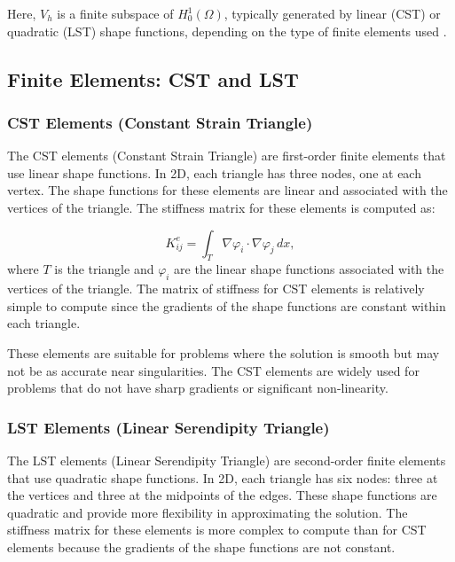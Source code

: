 Here, \(V_h\) is a finite subspace of \(H_0^1(\Omega)\), typically generated by linear (CST) or quadratic (LST) shape functions, depending on the type of finite elements used \cite{galerkin_method}.

\subsection{Finite Elements: CST and LST}

\subsubsection{CST Elements (Constant Strain Triangle)}

The CST elements (Constant Strain Triangle) are first-order finite elements that use linear shape functions. In 2D, each triangle has three nodes, one at each vertex. The shape functions for these elements are linear and associated with the vertices of the triangle. The stiffness matrix for these elements is computed as:

\begin{equation}
    K^e_{ij} = \int_T \nabla \varphi_i \cdot \nabla \varphi_j \, dx,
\end{equation}
where \(T\) is the triangle and \(\varphi_i\) are the linear shape functions associated with the vertices of the triangle. The matrix of stiffness for CST elements is relatively simple to compute since the gradients of the shape functions are constant within each triangle.

These elements are suitable for problems where the solution is smooth but may not be as accurate near singularities. The CST elements are widely used for problems that do not have sharp gradients or significant non-linearity.

\subsubsection{LST Elements (Linear Serendipity Triangle)}

The LST elements (Linear Serendipity Triangle) are second-order finite elements that use quadratic shape functions. In 2D, each triangle has six nodes: three at the vertices and three at the midpoints of the edges. These shape functions are quadratic and provide more flexibility in approximating the solution. The stiffness matrix for these elements is more complex to compute than for CST elements because the gradients of the shape functions are not constant.

